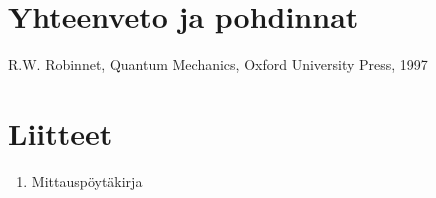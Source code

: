 \documentclass[a4paper,11pt]{article}
\begin{document}
\section{Yhteenveto ja pohdinnat}


\begin{thebibliography}{99}
\item{R.W. Robinnet, Quantum Mechanics, Oxford University Press, 1997}
\label{robinnet}

\end{thebibliography}

\section*{Liitteet}
\begin{enumerate}
\item{Mittauspöytäkirja}\label{mittaus}

\end{enumerate}
\end{document}
